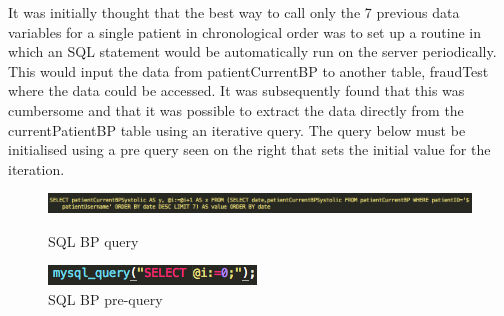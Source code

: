 \documentclass[11pt]{article}
\begin{document}
It was initially thought that the best way to call only the 7 previous data variables for a single patient in chronological order was to set up a routine in which an SQL statement would be automatically run on the server periodically. This would input the data from patientCurrentBP to another table, fraudTest where the data could be accessed. It was subsequently found that this was cumbersome and that it was possible to extract the data directly from the currentPatientBP table using an iterative query. The query below must be initialised using a pre query seen on the right that sets the initial value for the iteration.

\begin{figure}[h!] 
\includegraphics[width=\linewidth]{SQLBPquery.png}
\caption{SQL BP query \label{SQLBPquery}}
\endminipage\hfill
{}
\includegraphics[width=\linewidth]{SQLBPprequery.png}
\caption{SQL BP pre-query}
\endminipage
\end{figure} 
\end{document}
